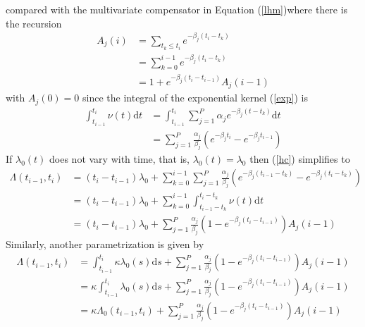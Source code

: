 \documentclass{amsart}
\newcommand{\mathd}{\mathrm{d}}
\begin{document}
compared with the multivariate compensator in Equation (\ref{lhm})where there
is the recursion
\begin{equation}
  \begin{array}{ll}
    A_j ( i) & = \sum_{t_k \leqslant t_i} e^{- \beta_j ( t_i - t_k)}\\
    & = \sum_{k = 0}^{i - 1} e^{- \beta_j ( t_i - t_k)}\\
    & = 1 + e^{- \beta_j ( t_i - t_{i - 1})} A_j ( i - 1)
  \end{array} \label{A}
\end{equation}
with $A_j ( 0) = 0$ since the integral of the exponential kernel (\ref{exp})
is
\begin{equation}
  \begin{array}{ll}
    \int_{t_{i - 1}}^{t_i} \nu ( t) \mathd t & = \int_{t_{i - 1}^{}}^{t_i}
    \sum_{j = 1}^P \alpha_j e^{- \beta_j  ( t - t_k)} \mathd t\\
    & = \sum_{j = 1}^P \frac{\alpha_j}{\beta_j}  ( e^{- \beta_j t_i} - e^{-
    \beta_j t_{i - 1}})
  \end{array}
\end{equation}
If $\lambda_0 ( t)$ does not vary with time, that is, $\lambda_0 ( t) =
\lambda_0$ then (\ref{hc}) simplifies to
\begin{equation}
  \begin{array}{ll}
    \Lambda ( t_{i - 1}, t_i) & = ( t_i - t_{i - 1})^{} \lambda_0 + \sum_{k =
    0}^{i - 1} \sum_{j = 1}^P \frac{\alpha_j}{\beta_j} ( e^{- \beta_j ( t_{i -
    1} - t_k)} - e^{- \beta_j ( t_i - t_k)})\\
    & = ( t_i - t_{i - 1})^{} \lambda_0 + \sum_{k = 0}^{i - 1} \int_{t_{i -
    1} - t_k}^{t_i - t_k} \nu ( t) \mathd t\\
    & = ( t_i - t_{i - 1})^{} \lambda_0 + \sum_{j = 1}^P
    \frac{\alpha_j}{\beta_j} ( 1 - e^{- \beta_j ( t_i - t_{i - 1})}) A_j ( i -
    1)
  \end{array}
\end{equation}
Similarly, another parametrization is given by
\begin{equation}
  \begin{array}{ll}
    \Lambda ( t_{i - 1}, t_i) & = \int_{t_{i - 1}^{}}^{t_i} \kappa \lambda_0 (
    s) \mathd s + \sum_{j = 1}^P \frac{\alpha_j}{\beta_j} ( 1 - e^{- \beta_j (
    t_i - t_{i - 1})}) A_j ( i - 1)\\
    & = \kappa \int_{t_{i - 1}^{}}^{t_i} \lambda_0 ( s) \mathd s + \sum_{j =
    1}^P \frac{\alpha_j}{\beta_j} ( 1 - e^{- \beta_j ( t_i - t_{i - 1})}) A_j
    ( i - 1)\\
    & = \kappa \Lambda_0 ( t_{i - 1}, t_i) + \sum_{j = 1}^P
    \frac{\alpha_j}{\beta_j} ( 1 - e^{- \beta_j ( t_i - t_{i - 1})}) A_j ( i -
    1)
  \end{array} \label{kappa}
\end{equation}
\end{document}
